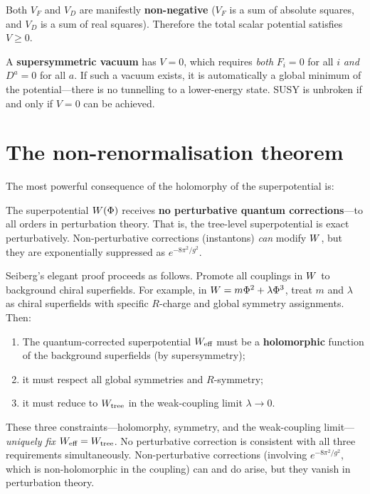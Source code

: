 \documentclass[11pt,a4paper]{article}
\begin{document}
\begin{warningbox}[title={$V \geq 0$: a special feature of SUSY}]
Both $V_F$ and $V_D$ are manifestly \textbf{non-negative}
($V_F$ is a sum of absolute squares, and $V_D$ is a sum of real squares).
Therefore the total scalar potential satisfies $V \geq 0$.

A \textbf{supersymmetric vacuum} has $V = 0$, which requires
\emph{both} $F_i = 0$ for all $i$ \emph{and} $D^a = 0$ for all $a$.
If such a vacuum exists, it is automatically a global minimum of the
potential---there is no tunnelling to a lower-energy state.  SUSY is
unbroken if and only if $V = 0$ can be achieved.
\end{warningbox}


\section{The non-renormalisation theorem}
\label{sec:nonrenorm}

The most powerful consequence of the holomorphy of the superpotential is:

\begin{theorem}
\label{thm:nonrenorm}
The superpotential $W(\Phi)$ receives \textbf{no perturbative
quantum corrections}---to all orders in perturbation theory.  That is,
the tree-level superpotential is exact perturbatively.
Non-perturbative corrections (instantons) \emph{can} modify $W$,
but they are exponentially suppressed as $e^{-8\pi^2/g^2}$.
\end{theorem}

\begin{remark}
\label{rem:seiberg-argument}
Seiberg's elegant proof \cite{Seiberg1993} proceeds as follows.
Promote all couplings in $W$ to background chiral superfields.
For example, in $W = m \Phi^2 + \lambda \Phi^3$, treat $m$ and
$\lambda$ as chiral superfields with specific $R$-charge and global
symmetry assignments.  Then:
\begin{enumerate}[label=(\roman*)]
  \item The quantum-corrected superpotential $W_{\text{eff}}$ must be a
    \textbf{holomorphic} function of the background superfields
    (by supersymmetry);
  \item it must respect all global symmetries and $R$-symmetry;
  \item it must reduce to $W_{\text{tree}}$ in the weak-coupling
    limit $\lambda \to 0$.
\end{enumerate}
These three constraints---holomorphy, symmetry, and the weak-coupling
limit---\emph{uniquely fix} $W_{\text{eff}} = W_{\text{tree}}$.
No perturbative correction is consistent with all three requirements
simultaneously.  Non-perturbative corrections (involving $e^{-8\pi^2/g^2}$,
which is non-holomorphic in the coupling) can and do arise, but they
vanish in perturbation theory.
\end{remark}
\end{document}
